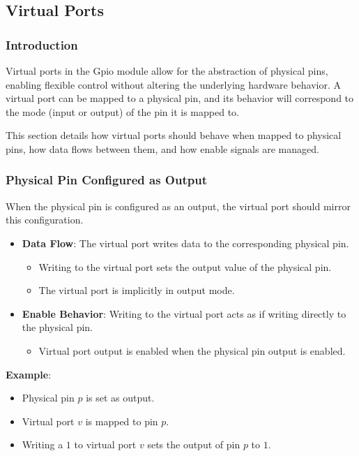 \subsection{Virtual Ports}

\subsubsection{Introduction}
Virtual ports in the Gpio module allow for the abstraction of physical pins, enabling flexible control without altering the underlying hardware behavior. A virtual port can be mapped to a physical pin, and its behavior will correspond to the mode (input or output) of the pin it is mapped to.

This section details how virtual ports should behave when mapped to physical pins, how data flows between them, and how enable signals are managed.

\subsubsection{Physical Pin Configured as Output}
When the physical pin is configured as an output, the virtual port should mirror this configuration.

\begin{itemize}[noitemsep]
    \item \textbf{Data Flow}: The virtual port writes data to the corresponding physical pin.
    \begin{itemize}[noitemsep]
        \item Writing to the virtual port sets the output value of the physical pin.
        \item The virtual port is implicitly in output mode.
    \end{itemize}
    \item \textbf{Enable Behavior}: Writing to the virtual port acts as if writing directly to the physical pin.
    \begin{itemize}[noitemsep]
        \item Virtual port output is enabled when the physical pin output is enabled.
    \end{itemize}
\end{itemize}

\textbf{Example}:
\begin{itemize}[noitemsep]
    \item Physical pin $p$ is set as output.
    \item Virtual port $v$ is mapped to pin $p$.
    \item Writing a $1$ to virtual port $v$ sets the output of pin $p$ to $1$.
\end{itemize}

